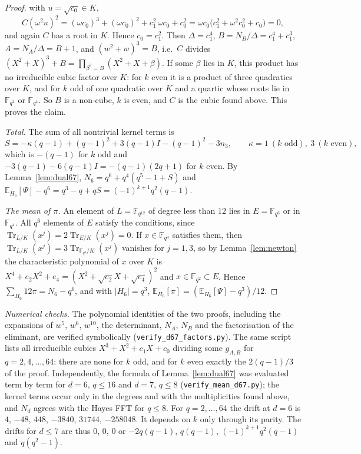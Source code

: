 \documentclass[11pt,a4paper]{amsart}
\theoremstyle{definition}
\theoremstyle{remark}
\newcommand{\F}{\mathbb{F}}
\newcommand{\Tr}{\operatorname{Tr}}
\newcommand{\E}{\mathbb{E}}
\begin{document}
\begin{proof}
with $u=\sqrt{c_0}\in K$,
\[
C(\omega^2u)^2=(\omega c_0)^3+(\omega c_0)^2+c_1^2\,\omega c_0+c_0^2=\omega c_0\bigl(c_1^2+\omega^2c_0^2+c_0\bigr)=0,
\]
and again $C$ has a root in $K$. Hence $c_0=c_1^2$. Then $\Delta=c_1^4$, $B=N_B/\Delta=c_1^4+c_1^3$,
$A=N_A/\Delta=B+1$, and $(w^2+w)^3=B$, i.e.\ $C$ divides $(X^2+X)^3+B=\prod_{\beta^3=B}(X^2+X+\beta)$. If some
$\beta$ lies in $K$, this product has no irreducible cubic factor over $K$: for $k$ even it is a product of three
quadratics over $K$, and for $k$ odd of one quadratic over $K$ and a quartic whose roots lie in $\F_{q^2}$ or
$\F_{q^4}$. So $B$ is a non-cube, $k$ is even, and $C$ is the cubic found above. This proves the claim.

\emph{Total.} The sum of all nontrivial kernel terms is
\[
S=-\kappa(q-1)+(q-1)^2+3(q-1)I-(q-1)^2-3n_3 ,\qquad \kappa=1\ (k\text{ odd}),\ 3\ (k\text{ even}),
\]
which is $-(q-1)$ for $k$ odd and $-3(q-1)-6(q-1)I=-(q-1)(2q+1)$ for $k$ even. By Lemma~\ref{lem:dual67},
$N_6=q^6+q^4(q^5-1+S)$ and $\E_{H_6}[\Psi]-q^6=q^3-q+qS=(-1)^{k+1}q^2(q-1)$.

\emph{The mean of $\pi$.} An element of $L=\F_{q^{12}}$ of degree less than $12$ lies in $E=\F_{q^6}$ or in
$\F_{q^4}$. All $q^6$ elements of $E$ satisfy the conditions, since $\Tr_{L/K}(x^j)=2\Tr_{E/K}(x^j)=0$. If
$x\in\F_{q^4}$ satisfies them, then $\Tr_{L/K}(x^j)=3\Tr_{\F_{q^4}/K}(x^j)$ vanishes for $j=1,3$, so by
Lemma~\ref{lem:newton} the characteristic polynomial of $x$ over $K$ is $X^4+e_2X^2+e_4=(X^2+\sqrt{e_2}X+\sqrt{e_4})^2$
and $x\in\F_{q^2}\subset E$. Hence $\sum_{H_6}12\pi=N_6-q^6$, and with $|H_6|=q^3$,
$\E_{H_6}[\pi]=(\E_{H_6}[\Psi]-q^3)/12$.
\end{proof}

\emph{Numerical checks.} The polynomial identities of the two proofs, including the expansions of $w^5$, $w^6$,
$w^{10}$, the determinant, $N_A$, $N_B$ and the factorisation of the eliminant, are verified symbolically
(\texttt{verify\_d67\_factors.py}). The same script lists all irreducible cubics $X^3+X^2+c_1X+c_0$ dividing some
$g_{A,B}$ for $q=2,4,\dots,64$: there are none for $k$ odd, and for $k$ even exactly the $2(q-1)/3$ of the proof.
Independently, the formula of Lemma~\ref{lem:dual67} was evaluated term by term for $d=6$, $q\le16$ and $d=7$,
$q\le8$ (\texttt{verify\_mean\_d67.py}); the kernel terms occur only in the degrees and with the multiplicities found
above, and $N_d$ agrees with the Hayes FFT for $q\le8$. For $q=2,\dots,64$ the drift at $d=6$ is $4$, $-48$, $448$,
$-3840$, $31744$, $-258048$. It depends on $k$ only through its parity. The drifts for
$d\le7$ are thus $0$, $0$, $0$ or $-2q(q-1)$, $q(q-1)$, $(-1)^{k+1}q^2(q-1)$ and $q(q^2-1)$.
\end{document}
